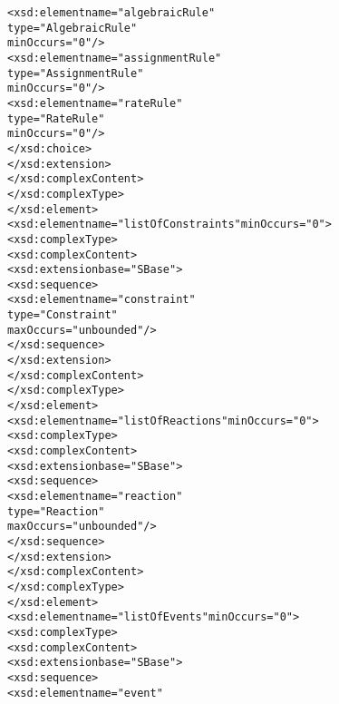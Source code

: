 \begin{alltt}
                                        <xsd:element name="algebraicRule" 
                                                     type="AlgebraicRule" 
                                                     minOccurs="0"/>
                                        <xsd:element name="assignmentRule" 
                                                     type="AssignmentRule" 
                                                     minOccurs="0"/>
                                        <xsd:element name="rateRule" 
                                                     type="RateRule" 
                                                     minOccurs="0"/>
                                    </xsd:choice>
                                </xsd:extension>
                            </xsd:complexContent>
                        </xsd:complexType>
                    </xsd:element>
                    <xsd:element name="listOfConstraints" minOccurs="0">
                        <xsd:complexType>
                            <xsd:complexContent>
                                <xsd:extension base="SBase">
                                    <xsd:sequence>
                                        <xsd:element name="constraint" 
                                                     type="Constraint" 
                                                     maxOccurs="unbounded"/>
                                    </xsd:sequence>
                                </xsd:extension>
                            </xsd:complexContent>
                        </xsd:complexType>
                    </xsd:element>
                    <xsd:element name="listOfReactions" minOccurs="0">
                        <xsd:complexType>
                            <xsd:complexContent>
                                <xsd:extension base="SBase">
                                    <xsd:sequence>
                                        <xsd:element name="reaction" 
                                                     type="Reaction" 
                                                     maxOccurs="unbounded"/>
                                    </xsd:sequence>
                                </xsd:extension>
                            </xsd:complexContent>
                        </xsd:complexType>
                    </xsd:element>
                    <xsd:element name="listOfEvents" minOccurs="0">
                        <xsd:complexType>
                            <xsd:complexContent>
                                <xsd:extension base="SBase">
                                    <xsd:sequence>
                                        <xsd:element name="event" 

\end{alltt}
